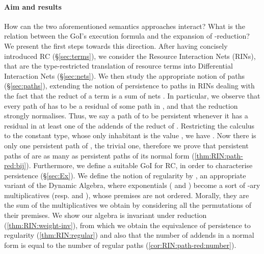 \paragraph{Aim and results}
How can the two aforementioned semantics approaches interact?
What is the relation between the GoI's execution formula and the expansion of 
-reduction?
We present the first steps towards this direction.
After having concisely introduced RC (§\ref{sec:terms}),
we consider the Resource Interaction Nets (RINs),
that are the type-restricted translation of 
resource terms into Differential Interaction Nets (§\ref{sec:nets}).
We then study the appropriate notion of paths (§\ref{sec:paths}), extending the 
notion of persistence to paths in RINs dealing with the fact that 
the reduct of a term  is a sum of nets .
In particular, we observe that every path of  has to be a residual of some 
path in , and that the reduction strongly normalises.
Thus, we say a path of  to be persistent whenever it has a residual in at 
least one of the addends of the reduct of .
Restricting the calculus to the constant type, whose only inhabitant is the 
value , we have .
Now there is only one persistent path of , the trivial one, therefore 
we prove that persistent paths of  are as many as persistent paths of its 
normal form (\autoref{thm:RIN:path-red:bij}).
Furthermore, we define a suitable GoI for RC, in order to characterise 
persistence (§\ref{sec:Ex}).
We define the notion of regularity by , an appropriate variant of 
the Dynamic Algebra, where exponentials ( and ) become a sort of 
-ary multiplicatives (resp.  and ), whose premises are 
not ordered.
Morally, they are the sum of the multiplicatives we obtain by considering all 
the  permutations of their premises.
We show our algebra is invariant under reduction 
(\autoref{thm:RIN:weight-inv}), 
from which we obtain the equivalence of persistence to regularity
(\autoref{thm:RIN:regular}) and also that the number of addends in a normal 
form is 
equal to the number of regular paths (\autoref{cor:RIN:path-red:number}).

